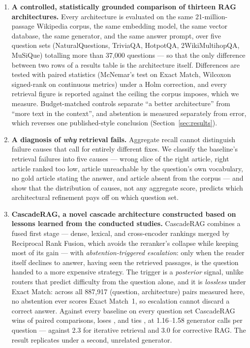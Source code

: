 \begin{enumerate}
\item \textbf{A controlled, statistically grounded comparison of thirteen
RAG architectures.} Every architecture is evaluated on the same 21-million-passage
Wikipedia corpus, the same embedding model, the same vector database, the
same generator, and the same answer prompt, over five question sets
(NaturalQuestions, TriviaQA, HotpotQA, 2WikiMultihopQA, MuSiQue) totalling
more than 37{,}000 questions --- so that the only difference between two rows of
a results table is the architecture itself. Differences are tested with
paired statistics (McNemar's test on Exact Match, Wilcoxon signed-rank on
continuous metrics) under a Holm correction, and every retrieval figure is
reported against the ceiling the corpus imposes, which we measure. Budget-matched
controls separate ``a better architecture'' from ``more text in the
context'', and abstention is measured separately from error, which reverses
one published-style conclusion (Section~\ref{sec:results}).

\item \textbf{A diagnosis of \emph{why} retrieval fails.} Aggregate recall
cannot distinguish failure causes that call for entirely different fixes. We
classify the baseline's retrieval failures into five causes --- wrong slice
of the right article, right article ranked too low, article unreachable by
the question's own vocabulary, no gold article stating the answer, and
article absent from the corpus --- and show that the distribution of causes,
not any aggregate score, predicts which architectural refinement pays off
on which question set.

\item \textbf{CascadeRAG, a novel cascade architecture constructed based
on lessons learned from the conducted studies.} CascadeRAG combines a fused first stage --- dense, lexical, and cross-encoder rankings
merged by Reciprocal Rank Fusion, which avoids the reranker's collapse
while keeping most of its gain --- with \emph{abstention-triggered
escalation}: only when the reader itself declines to answer, having seen
the retrieved passages, is the question handed to a more expensive
strategy. The trigger is a \emph{posterior} signal, unlike routers that
predict difficulty from the question alone, and it is \emph{lossless} under
Exact Match: across all 887{,}917 (question, architecture) pairs measured
here, no abstention ever scores Exact Match~1, so escalation cannot discard
a correct answer. Against every baseline on every question set CascadeRAG
wins \ResultWins{} of \ResultPairs{} paired comparisons, loses
\ResultLosses{}, and ties \ResultTies{}, at 1.16--1.58 generator calls per
question --- against 2.3 for iterative retrieval and 3.0 for corrective
RAG. The result replicates under a second, unrelated generator.
\end{enumerate}

